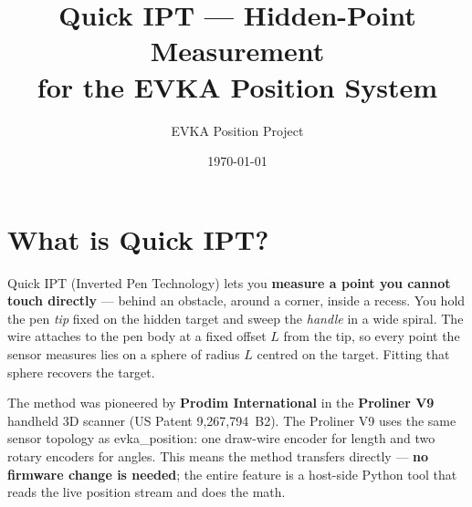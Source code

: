 \documentclass[11pt,a4paper]{article}
\title{Quick IPT --- Hidden-Point Measurement\\for the EVKA Position System}
\author{EVKA Position Project}
\date{\today}
\begin{document}
\maketitle

\section{What is Quick IPT?}

Quick IPT (Inverted Pen Technology) lets you \textbf{measure a point you cannot
touch directly} --- behind an obstacle, around a corner, inside a recess.  You
hold the pen \emph{tip} fixed on the hidden target and sweep the \emph{handle}
in a wide spiral.  The wire attaches to the pen body at a fixed offset $L$ from
the tip, so every point the sensor measures lies on a sphere of radius $L$
centred on the target.  Fitting that sphere recovers the target.

The method was pioneered by \textbf{Prodim International} in the
\textbf{Proliner V9} handheld 3D scanner (US Patent 9{,}267{,}794~B2).  The
Proliner V9 uses the same sensor topology as evka\_position: one draw-wire
encoder for length and two rotary encoders for angles.  This means the method
transfers directly --- \textbf{no firmware change is needed}; the entire feature
is a host-side Python tool that reads the live position stream and does the
math.

\begin{center}
\end{center}
\end{document}
